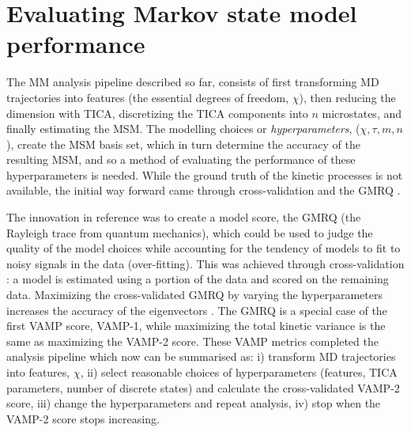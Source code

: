 \section{Evaluating Markov state model performance}\label{sec:intro_msm_perf}
The MM analysis pipeline described so far, consists of first transforming MD trajectories into features (the essential degrees of freedom, $\chi$), then reducing the dimension with TICA,  discretizing the TICA components into $n$ microstates, and finally estimating the MSM. The modelling choices or \emph{hyperparameters}, ($\chi, \tau, m, n$), create the MSM basis set, which in turn determine the accuracy of the resulting MSM, and so a method of evaluating the performance of these hyperparameters  is needed. While the ground truth of the kinetic processes is not available, the initial way forward came through cross-validation and the GMRQ \cite{mcgibbonVariationalCrossvalidationSlow2015}. 

The innovation in reference \cite{mcgibbonVariationalCrossvalidationSlow2015} was to create a model score, the GMRQ (the Rayleigh trace from quantum mechanics), which could be used to judge the quality of the model choices while accounting for the tendency of models to fit to noisy signals in the data (over-fitting). This was achieved through cross-validation \cite{arlotSurveyCrossvalidationProcedures2009}: a model is estimated using a portion of the data and scored on the remaining data. Maximizing the cross-validated GMRQ by varying the hyperparameters increases the accuracy of the eigenvectors \cite{mcgibbonVariationalCrossvalidationSlow2015}. The GMRQ is a special case of the first VAMP score, VAMP-1, while maximizing the total kinetic variance is the same as maximizing the VAMP-2 score. These VAMP metrics completed the analysis pipeline \cite{schererVariationalSelectionFeatures2019} which now can be summarised as: i) transform MD trajectories into features, $\chi$, ii) select reasonable choices of  hyperparameters (features, TICA parameters, number of discrete states) and calculate the cross-validated VAMP-2 score, iii) change the hyperparameters and repeat analysis, iv) stop when the VAMP-2 score stops increasing. 

